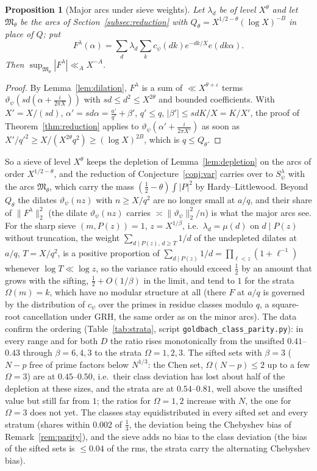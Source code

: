 \documentclass[11pt]{amsart}
\newtheorem{proposition}[theorem]{Proposition}
\theoremstyle{remark}
\newcommand{\vt}{\vartheta}
\newcommand{\e}{\varepsilon}
\begin{document}
\begin{proposition}[Major arcs under sieve weights]\label{prop:siftedarcs}
Let $\lambda_d$ be of level $X^\theta$ and let $\mathfrak M_\theta$ be the arcs of Section~\ref{subsec:reduction} with $Q_\theta=X^{1/2-\theta}(\log X)^{-B}$ in place of $Q$; put
\[
F^\lambda(\alpha)=\sum_d\lambda_d\sum_kc_\psi(dk)e^{-dk/X}e(dk\alpha).
\] Then $\sup_{\mathfrak M_\theta}|F^\lambda|\ll_AX^{-A}$.
\end{proposition}
\begin{proof}
By Lemma~\ref{lem:dilation}, $F^\lambda$ is a sum of $\ll X^{\theta+\e}$ terms $\vt_\psi(sd(\alpha+\frac i{2\pi X}))$ with $sd\le d^2\le X^{2\theta}$ and bounded coefficients. With $X'=X/(sd)$, $\alpha'=sd\alpha=\frac{a'}{q'}+\beta'$, $q'\le q$, $|\beta'|\le sdK/X=K/X'$, the proof of Theorem~\ref{thm:reduction} applies to $\vt_\psi(\alpha'+\frac i{2\pi X'})$ as soon as $X'/q'^2\ge X/(X^{2\theta}q^2)\ge(\log X)^{2B}$, which is $q\le Q_\theta$.
\end{proof}

So a sieve of level $X^\theta$ keeps the depletion of Lemma~\ref{lem:depletion} on the arcs of order $X^{1/2-\theta}$, and the reduction of Conjecture~\ref{conj:var} carries over to $S^\lambda_\psi$ with the arcs $\mathfrak M_\theta$, which carry the mass $(\frac12-\theta)\int|P|^2$ by Hardy--Littlewood. Beyond $Q_\theta$ the dilates $\vt_\psi(nz)$ with $n\ge X/q^2$ are no longer small at $a/q$, and their share of $\|F^\lambda\|_2^2$ (the dilate $\vt_\psi(nz)$ carries $\asymp\|\vt_\psi\|_2^2/n$) is what the major arcs see. For the sharp sieve $(m,P(z))=1$, $z=X^{1/\beta}$, i.e.\ $\lambda_d=\mu(d)$ on $d\mid P(z)$ without truncation, the weight $\sum_{d\mid P(z),\,d\ge T}1/d$ of the undepleted dilates at $a/q$, $T=X/q^2$, is a positive proportion of $\sum_{d\mid P(z)}1/d=\prod_{\ell<z}(1+\ell^{-1})$ whenever $\log T\ll\log z$, so the variance ratio should exceed $\frac12$ by an amount that grows with the sifting, $\frac12+O(1/\beta)$ in the limit, and tend to $1$ for the strata $\Omega(m)=k$, which have no modular structure at all (there $F$ at $a/q$ is governed by the distribution of $c_\psi$ over the primes in residue classes modulo $q$, a square-root cancellation under GRH, the same order as on the minor arcs). The data confirm the ordering (Table~\ref{tab:strata}, script \texttt{goldbach\_class\_parity.py}): in every range and for both $D$ the ratio rises monotonically from the unsifted $0.41$--$0.43$ through $\beta=6,4,3$ to the strata $\Omega=1,2,3$. The sifted sets with $\beta=3$ ($N-p$ free of prime factors below $N^{1/3}$: the Chen set, $\Omega(N-p)\le2$ up to a few $\Omega=3$) are at $0.45$--$0.50$, i.e.\ their class deviation has lost about half of the depletion at these sizes, and the strata are at $0.54$--$0.81$, well above the unsifted value but still far from $1$; the ratios for $\Omega=1,2$ increase with $N$, the one for $\Omega=3$ does not yet. The classes stay equidistributed in every sifted set and every stratum (shares within $0.002$ of $\frac13$, the deviation being the Chebyshev bias of Remark~\ref{rem:parity}), and the sieve adds no bias to the class deviation (the bias of the sifted sets is $\le0.04$ of the rms, the strata carry the alternating Chebyshev bias).
\end{document}

